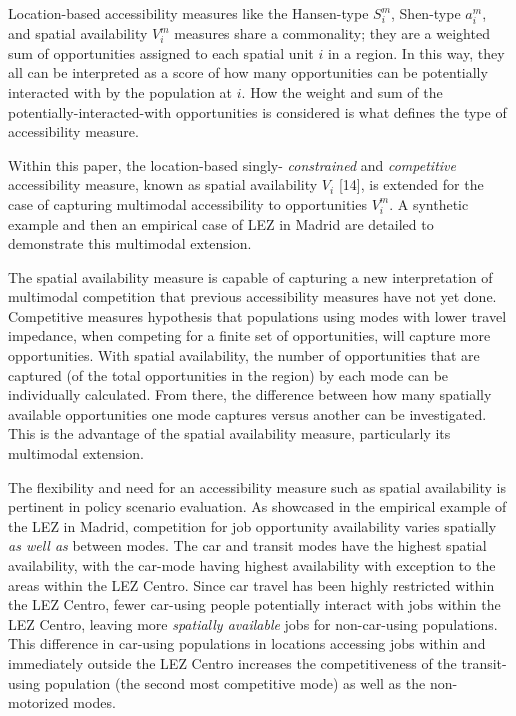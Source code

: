 \documentclass[10pt,letterpaper]{article}
\begin{document}
Location-based accessibility measures like the Hansen-type \(S_i^m\),
Shen-type \(a_i^m\), and spatial availability \(V_i^m\) measures share a
commonality; they are a weighted sum of opportunities assigned to each
spatial unit \(i\) in a region. In this way, they all can be interpreted
as a score of how many opportunities can be potentially interacted with
by the population at \(i\). How the weight and sum of the
potentially-interacted-with opportunities is considered is what defines
the type of accessibility measure.

Within this paper, the location-based singly- \emph{constrained} and
\emph{competitive} accessibility measure, known as spatial availability
\(V_i\) {[}14{]}, is extended for the case of capturing multimodal
accessibility to opportunities \(V_i^m\). A synthetic example and then
an empirical case of LEZ in Madrid are detailed to demonstrate this
multimodal extension.

The spatial availability measure is capable of capturing a new
interpretation of multimodal competition that previous accessibility
measures have not yet done. Competitive measures hypothesis that
populations using modes with lower travel impedance, when competing for
a finite set of opportunities, will capture more opportunities. With
spatial availability, the number of opportunities that are captured (of
the total opportunities in the region) by each mode can be individually
calculated. From there, the difference between how many spatially
available opportunities one mode captures versus another can be
investigated. This is the advantage of the spatial availability measure,
particularly its multimodal extension.

The flexibility and need for an accessibility measure such as spatial
availability is pertinent in policy scenario evaluation. As showcased in
the empirical example of the LEZ in Madrid, competition for job
opportunity availability varies spatially \emph{as well as} between
modes. The car and transit modes have the highest spatial availability,
with the car-mode having highest availability with exception to the
areas within the LEZ Centro. Since car travel has been highly restricted
within the LEZ Centro, fewer car-using people potentially interact with
jobs within the LEZ Centro, leaving more \emph{spatially available} jobs
for non-car-using populations. This difference in car-using populations
in locations accessing jobs within and immediately outside the LEZ
Centro increases the competitiveness of the transit-using population
(the second most competitive mode) as well as the non-motorized modes.
\end{document}
